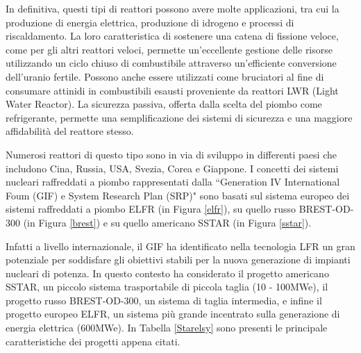 In definitiva, questi tipi di reattori possono avere molte applicazioni, tra 
cui 
la produzione di energia elettrica, produzione di idrogeno e processi di 
riscaldamento.
La loro caratteristica di sostenere una catena di fissione veloce, come per gli 
altri reattori veloci, permette un'eccellente gestione delle risorse 
utilizzando 
un ciclo chiuso di combustibile attraverso un'efficiente conversione 
dell'uranio 
fertile. Possono anche essere utilizzati come bruciatori al fine di consumare 
attinidi in combustibili esausti proveniente da reattori LWR (Light Water 
Reactor).
La sicurezza passiva, offerta dalla scelta del piombo come refrigerante, 
permette una semplificazione dei sistemi di sicurezza e una maggiore 
affidabilità del reattore stesso.

Numerosi reattori di questo tipo sono in via di sviluppo in differenti paesi 
che 
includono Cina, Russia, USA, Svezia, Corea e Giappone.
I concetti dei sistemi nucleari raffreddati a piombo rappresentati dalla 
``Generation IV International Foum (GIF) e System Research Plan (SRP)" sono 
basati sul sistema europeo dei sistemi raffreddati a piombo ELFR (in Figura 
\ref{elfr}), su quello russo BREST-OD-300 (in Figura \ref{brest}) e su
quello americano SSTAR (in Figura \ref{sstar}).

Infatti a livello internazionale, il GIF ha identificato nella tecnologia LFR un gran 
potenziale per soddisfare gli obiettivi stabili per la nuova generazione di 
impianti nucleari di potenza.
In questo contesto ha considerato il progetto americano SSTAR, un piccolo 
sistema trasportabile di piccola taglia (10 - 100MWe), il progetto russo 
BREST-OD-300, un sistema di taglia intermedia, e infine il progetto europeo 
ELFR, un sistema più grande incentrato sulla generazione di energia elettrica 
(600MWe). In Tabella \ref{Starelsy} sono presenti le principale caratteristiche 
dei progetti appena citati.

